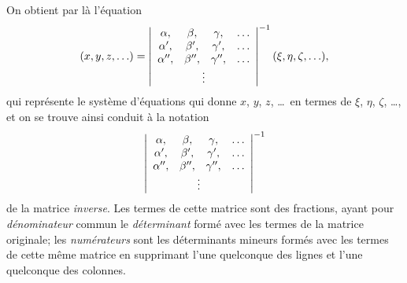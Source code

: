 \documentclass[11pt,a4paper]{article}
\begin{document}
\medskip

On obtient par l\`a l'\'equation
\[
(x,y,z,\ldots) = \left\lvert\begin{array}{cccc}
\alpha , & \beta , & \gamma , & \ldots\\
\alpha', & \beta', & \gamma', & \ldots\\
\alpha'', & \beta'', & \gamma'', & \ldots\\
\multicolumn{4}{c}{\vdots}
\end{array}\right\rvert^{-1} (\xi,\eta,\zeta,\ldots),
\]
qui repr\'esente le syst\`eme d'\'equations qui donne $x$, $y$, $z$, \ldots\ en termes de $\xi$, $\eta$, $\zeta$, \ldots, et on se trouve ainsi conduit \`a la notation
\[
\left\lvert\begin{array}{cccc}
\alpha , & \beta , & \gamma , & \ldots\\
\alpha', & \beta', & \gamma', & \ldots\\
\alpha'', & \beta'', & \gamma'', & \ldots\\
\multicolumn{4}{c}{\vdots}
\end{array}\right\rvert^{-1}
\]
de la matrice \textit{inverse}. Les termes de cette matrice sont des fractions, ayant pour \textit{d\'enominateur} commun le \textit{d\'eterminant} form\'e avec les termes de la matrice originale; les \textit{num\'erateurs} sont les d\'eterminants mineurs form\'es avec les termes de cette m\^eme matrice en supprimant l'une quelconque des lignes et l'une quelconque des colonnes.

\medskip
\end{document}
